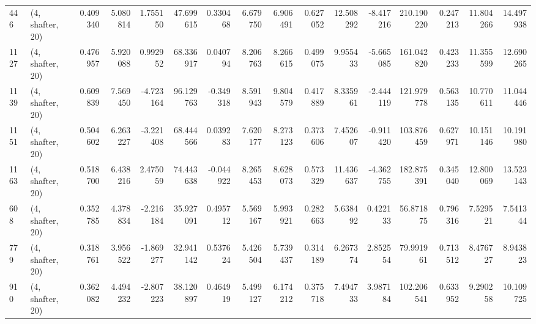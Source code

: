 \begin{tabular}{llrrrrrrrrrrrrrr}
446  &  (4, shafter, 20) &   0.409340 &   5.080814 &   1.755150 &     47.699615 &    0.330468 &    6.679750 &    6.906491 &  0.627052 &  12.508292 &  -8.417216 &   210.190220 &   0.247213 &  11.804266 &  14.497938 \\
1127 &  (4, shafter, 20) &   0.476957 &   5.920088 &   0.992952 &     68.336917 &    0.040794 &    8.206763 &    8.266615 &  0.499075 &   9.955433 &  -5.665085 &   161.042820 &   0.423233 &  11.355599 &  12.690265 \\
1139 &  (4, shafter, 20) &   0.609839 &   7.569450 &  -4.723164 &     96.129763 &   -0.349318 &    8.591943 &    9.804579 &  0.417889 &   8.335961 &  -2.444119 &   121.979778 &   0.563135 &  10.770611 &  11.044446 \\
1151 &  (4, shafter, 20) &   0.504602 &   6.263227 &  -3.221408 &     68.444566 &    0.039283 &    7.620177 &    8.273123 &  0.373606 &   7.452607 &  -0.911420 &   103.876459 &   0.627971 &  10.151146 &  10.191980 \\
1163 &  (4, shafter, 20) &   0.518700 &   6.438216 &   2.475059 &     74.443638 &   -0.044922 &    8.265453 &    8.628073 &  0.573329 &  11.436637 &  -4.362755 &   182.875391 &   0.345040 &  12.800069 &  13.523143 \\
608  &  (4, shafter, 20) &   0.352785 &   4.378834 &  -2.216184 &     35.927091 &    0.495712 &    5.569167 &    5.993921 &  0.282663 &   5.638492 &   0.422133 &    56.871875 &   0.796316 &   7.529521 &   7.541344 \\
779  &  (4, shafter, 20) &   0.318761 &   3.956522 &  -1.869277 &     32.941142 &    0.537624 &    5.426504 &    5.739437 &  0.314189 &   6.267374 &   2.852554 &    79.991961 &   0.713512 &   8.476727 &   8.943823 \\
910  &  (4, shafter, 20) &   0.362082 &   4.494232 &  -2.807223 &     38.120897 &    0.464919 &    5.499127 &    6.174212 &  0.375718 &   7.494733 &   3.987184 &   102.206541 &   0.633952 &   9.290258 &  10.109725 \\
\bottomrule
\end{tabular}

